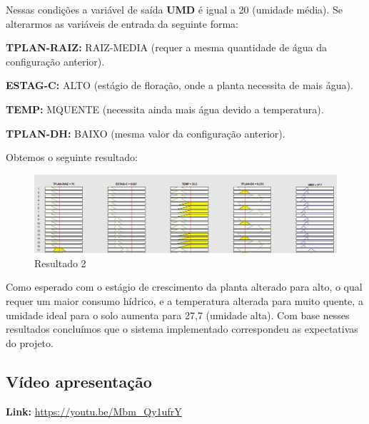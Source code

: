 Nessas condições a variável de saída \textbf{UMD} é igual a 20 (umidade média). Se alterarmos as variáveis de entrada da seguinte forma:  

\textbf{TPLAN-RAIZ:} RAIZ-MEDIA (requer a mesma quantidade de água da configuração anterior).

\textbf{ESTAG-C:} ALTO (estágio de floração, onde a planta necessita de mais água).

\textbf{TEMP:} MQUENTE (necessita ainda mais água devido a temperatura).

\textbf{TPLAN-DH:} BAIXO (mesma valor da configuração anterior).

Obtemos o seguinte resultado:

\begin{figure}[h!]
\centering
\includegraphics[width=1\linewidth]{Resultados/Imagens/resultado2}
\caption{Resultado 2}
\label{fig:resultado2}
\end{figure}

Como esperado com o estágio de crescimento da planta alterado para alto, o qual requer um maior consumo hídrico, e a temperatura alterada para muito quente, a umidade ideal para o solo aumenta para 27,7 (umidade alta). Com base nesses resultados concluímos que o sistema \fuzzy implementado correspondeu as expectativas do projeto. 

\subsection{Vídeo apresentação}

\textbf{Link:} \url{https://youtu.be/Mbm_Qy1ufrY} 
